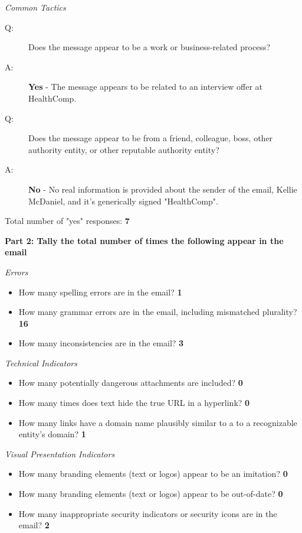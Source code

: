 \begin{fullwidth}
\textit{Common Tactics}
\begin{description}
    \item[Q:] Does the message appear to be a work or business-related process?
    \item[A:] \textbf{Yes} - The message appears to be related to an interview offer at HealthComp.
    \item[Q:] Does the message appear to be from a friend, colleague, boss, other authority
entity, or other reputable authority entity?
    \item[A:] \textbf{No} - No real information is provided about the sender of the email, Kellie McDaniel, and it's generically signed "HealthComp".
\end{description}

Total number of "yes" responses: \textbf{7}

\textbf{Part 2: Tally the total number of times the following appear in the email}

\textit{Errors}
\begin{itemize}
    \item How many spelling errors are in the email? \textbf{1}
    \item How many grammar errors are in the email, including mismatched plurality? \textbf{16}
    \item How many inconsistencies are in the email? \textbf{3}
\end{itemize}

\textit{Technical Indicators}
\begin{itemize}
    \item How many potentially dangerous attachments are included? \textbf{0}
    \item How many times does text hide the true URL in a hyperlink? \textbf{0}
    \item How many links have a domain name plausibly similar to a to a recognizable
entity's domain? \textbf{1}
\end{itemize}

\textit{Visual Presentation Indicators}
\begin{itemize}
    \item How many branding elements (text or logos) appear to be an imitation? \textbf{0}
    \item How many branding elements (text or logos) appear to be out-of-date? \textbf{0}
    \item How many inappropriate security indicators or security icons are in the
email? \textbf{2}
\end{itemize}


\end{fullwidth}
